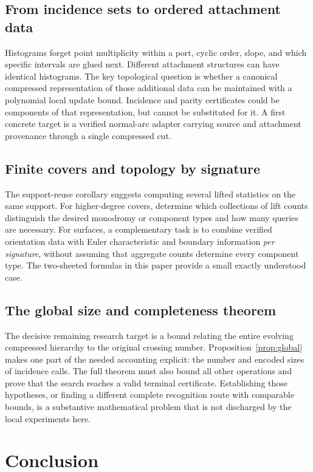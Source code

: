 \documentclass[11pt,letterpaper]{article}
\theoremstyle{definition}\newtheorem{definition}[theorem]{Definition}
\theoremstyle{remark}\newtheorem{remark}[theorem]{Remark}
\begin{document}
\subsection{From incidence sets to ordered attachment data}
Histograms forget point multiplicity within a port, cyclic order, slope, and which specific intervals are glued next. Different attachment structures can have identical histograms. The key topological question is whether a canonical compressed representation of those additional data can be maintained with a polynomial local update bound. Incidence and parity certificates could be components of that representation, but cannot be substituted for it. A first concrete target is a verified normal-arc adapter carrying source and attachment provenance through a single compressed cut.

\subsection{Finite covers and topology by signature}
The support-reuse corollary suggests computing several lifted statistics on the same support. For higher-degree covers, determine which collections of lift counts distinguish the desired monodromy or component types and how many queries are necessary. For surfaces, a complementary task is to combine verified orientation data with Euler characteristic and boundary information \emph{per signature}, without assuming that aggregate counts determine every component type. The two-sheeted formulas in this paper provide a small exactly understood case.

\subsection{The global size and completeness theorem}
The decisive remaining research target is a bound relating the entire evolving compressed hierarchy to the original crossing number. Proposition~\ref{prop:global} makes one part of the needed accounting explicit: the number and encoded sizes of incidence calls. The full theorem must also bound all other operations and prove that the search reaches a valid terminal certificate. Establishing those hypotheses, or finding a different complete recognition route with comparable bounds, is a substantive mathematical problem that is not discharged by the local experiments here.

\section{Conclusion}
\end{document}
